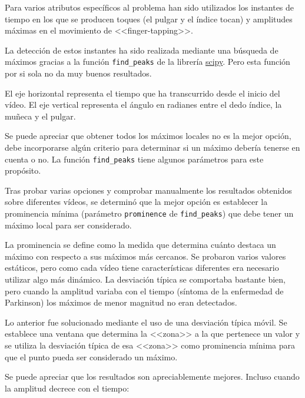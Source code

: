 Para varios atributos específicos al problema han sido utilizados los instantes
de tiempo en los que se producen toques (el pulgar y el índice tocan) y
amplitudes máximas en el movimiento de <<finger-tapping>>.

La detección de estos instantes ha sido realizada mediante una búsqueda de
máximos gracias a la función \texttt{find\_peaks} de la librería
\href{https://scipy.org/}{scipy}. Pero esta función por si sola no da muy buenos
resultados.


El eje horizontal representa el tiempo que ha transcurrido desde el inicio del
vídeo. El eje vertical representa el ángulo en radianes entre el dedo índice, la
muñeca y el pulgar.

Se puede apreciar que obtener todos los máximos locales no es la mejor opción,
debe incorporarse algún criterio para determinar si un máximo debería tenerse en
cuenta o no. La función \texttt{find\_peaks} tiene algunos parámetros para este
propósito.

Tras probar varias opciones y comprobar manualmente los resultados obtenidos
sobre diferentes vídeos, se determinó que la mejor opción es establecer la
prominencia mínima (parámetro \texttt{prominence} de \texttt{find\_peaks}) que debe tener
un máximo local para ser considerado.

La prominencia se define como la medida que determina cuánto destaca un máximo
con respecto a sus máximos más cercanos. Se probaron varios valores estáticos,
pero como cada vídeo tiene características diferentes era necesario utilizar
algo más dinámico. La desviación típica se comportaba bastante bien, pero cuando
la amplitud variaba con el tiempo (síntoma de la enfermedad de Parkinson) los
máximos de menor magnitud no eran detectados.

Lo anterior fue solucionado  mediante el uso de una desviación típica móvil. Se
establece una ventana que determina la <<zona>> a la que pertenece un valor y se
utiliza la desviación típica de esa <<zona>> como prominencia mínima para que el
punto pueda ser considerado un máximo.


Se puede apreciar que los resultados son apreciablemente mejores. Incluso cuando
la amplitud decrece con el tiempo:

